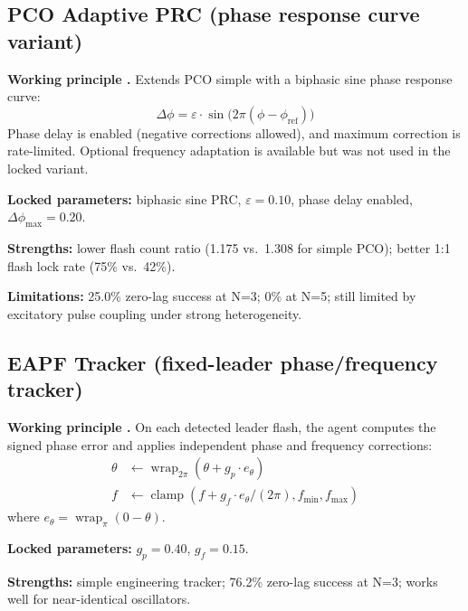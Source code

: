 \documentclass[11pt,a4paper]{article}
\begin{document}
\subsection{PCO Adaptive PRC (phase response curve variant)}

\textbf{Working principle \cite{mirollo1990synchronization,tyrrell2006fireflies}.}
Extends PCO simple with a biphasic sine phase response curve:
\begin{equation}
  \Delta\phi = \varepsilon \cdot \sin\bigl(2\pi(\phi - \phi_{\text{ref}})\bigr)
\end{equation}
Phase delay is enabled (negative corrections allowed), and maximum correction
is rate-limited.  Optional frequency adaptation is available but was not used
in the locked variant.

\textbf{Locked parameters:} biphasic sine PRC, $\varepsilon = 0.10$,
phase delay enabled, $\Delta\phi_{\max} = 0.20$.

\textbf{Strengths:} lower flash count ratio (1.175 vs.\ 1.308 for simple PCO);
better 1:1 flash lock rate (75\% vs.\ 42\%).

\textbf{Limitations:} 25.0\% zero-lag success at N=3; 0\% at N=5;
still limited by excitatory pulse coupling under strong heterogeneity.

\subsection{EAPF Tracker (fixed-leader phase/frequency tracker)}

\textbf{Working principle \cite{gardner2005phaselock}.}
On each detected leader flash, the agent computes the signed phase error
and applies independent phase and frequency corrections:
\begin{align}
  \theta &\leftarrow \operatorname{wrap}_{2\pi}(\theta + g_p \cdot e_\theta) \\
  f      &\leftarrow \operatorname{clamp}(f + g_f \cdot e_\theta / (2\pi),
                                          f_{\min}, f_{\max})
\end{align}
where $e_\theta = \operatorname{wrap}_\pi(0 - \theta)$.

\textbf{Locked parameters:} $g_p = 0.40$, $g_f = 0.15$.

\textbf{Strengths:} simple engineering tracker; 76.2\% zero-lag success at N=3;
works well for near-identical oscillators.
\end{document}
